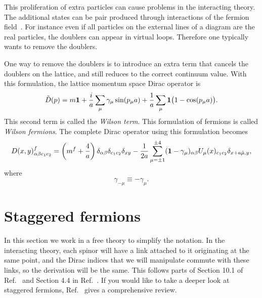 This proliferation of extra particles can cause problems in the
interacting theory. The additional states can be pair produced
through interactions of the fermion field~\cite{montvay_quantum_1994}.
For instance even if all particles on the external lines of a diagram
are the real particles, the doublers can appear in virtual loops.
Therefore one typically wants to remove the doublers.

One way to remove the doublers is to introduce an extra term that
cancels the doublers on the lattice, and still reduces to the
correct continuum value. With this formulation, the lattice
momentum space Dirac operator is
\begin{equation}
  \tilde{D}(p)=m{\mathbf 1}+\frac{i}{a}\sum_\mu\gamma_\mu\sin(p_\mu a)
                   +\frac{1}{a}\sum_\mu{\mathbf 1}\big(1-\cos(p_\mu a)\big).
\end{equation} 
This second term is called the {\it Wilson term}. 
This formulation
of fermions is called {\it Wilson fermions}. The complete Dirac
operator using this formulation becomes 
\begin{equation}\label{eq:WilsonDirac}
  D(x,y)^f_{\alpha\beta c_1c_2}
  =\left(m^f+\frac{4}{a}\right)\delta_{\alpha\beta}
                               \delta_{c_1c_2}
                               \delta_{xy}
   -\frac{1}{2a}\sum_{\mu=\pm 1}^{\pm 4}({\mathbf 1}-\gamma_\mu)_{\alpha\beta}
      U_\mu(x)_{c_1 c_2}\delta_{x+a\hat{\mu},y},
\end{equation}
where
\begin{equation}
  \gamma_{-\mu}\equiv-\gamma_{\mu}.
\end{equation}

\section{Staggered
fermions}\label{sec:stagg}

In this section we work in a free theory to simplify the notation.
In the interacting theory, each spinor will have a link attached to it
originating at the same point, and the Dirac indices that we will
manipulate commute with these links, so the derivation will be the same.
This follows parts of Section 10.1 of Ref.~\cite{gattringer_quantum_2010} 
and Section 4.4 in Ref.~\cite{rothe_lattice_2005}.
If you would like to take a deeper look at staggered fermions,
Ref.~\cite{Golterman:2024xos} gives a comprehensive review.

